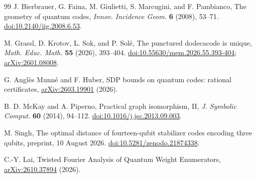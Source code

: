 \begin{thebibliography}{99}
J. Bierbrauer, G. Faina, M. Giulietti, S. Marcugini, and F. Pambianco,
The geometry of quantum codes,
\emph{Innov. Incidence Geom.} \textbf{6} (2008), 53--71.
\href{https://doi.org/10.2140/iig.2008.6.53}{doi:10.2140/iig.2008.6.53}.

M. Grassl, D. Krotov, L. Sok, and P. Sol\'e,
The punctured dodecacode is unique,
\emph{Math. Educ. Math.} \textbf{55} (2026), 393--404.
\href{https://doi.org/10.55630/mem.2026.55.393-404}{doi:10.55630/mem.2026.55.393-404};
\href{https://arxiv.org/abs/2601.08008}{arXiv:2601.08008}.

G. Angl\`es Munn\'e and F. Huber,
SDP bounds on quantum codes: rational certificates,
\href{https://arxiv.org/abs/2603.19901}{arXiv:2603.19901} (2026).

B. D. McKay and A. Piperno,
Practical graph isomorphism, II,
\emph{J. Symbolic Comput.} \textbf{60} (2014), 94--112.
\href{https://doi.org/10.1016/j.jsc.2013.09.003}{doi:10.1016/j.jsc.2013.09.003}.

M. Singh, The optimal distance of fourteen-qubit stabilizer codes encoding
three qubits, preprint, 10 August 2026.
\href{https://doi.org/10.5281/zenodo.21874338}{doi:10.5281/zenodo.21874338}.

C.-Y. Lai, Twisted Fourier Analysis of Quantum Weight Enumerators,
\href{https://arxiv.org/abs/2610.37894}{arXiv:2610.37894} (2026).

\end{thebibliography}
